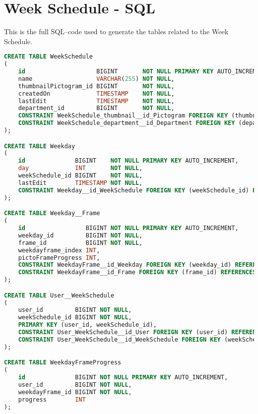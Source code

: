 \chapter{Week Schedule - SQL}\label{app:weekschedulesql}
This is the full SQL--code used to generate the tables related to the Week Schedule. 
\begin{lstlisting}[language=sql]
CREATE TABLE WeekSchedule
(
    id                    BIGINT       NOT NULL PRIMARY KEY AUTO_INCREMENT,
    name                  VARCHAR(255) NOT NULL,
    thumbnailPictogram_id BIGINT       NOT NULL,
    createdOn             TIMESTAMP    NOT NULL,
    lastEdit              TIMESTAMP    NOT NULL,
    department_id         BIGINT       NOT NULL,
    CONSTRAINT WeekSchedule_thumbnail__id_Pictogram FOREIGN KEY (thumbnailPictogram_id) REFERENCES Pictogram (frame_id),
    CONSTRAINT WeekSchedule_department__id_Department FOREIGN KEY (department_id) REFERENCES Department (id)
);

CREATE TABLE Weekday
(
    id              BIGINT    NOT NULL PRIMARY KEY AUTO_INCREMENT,
    day             INT       NOT NULL,
    weekSchedule_id BIGINT    NOT NULL,
    lastEdit        TIMESTAMP NOT NULL,
    CONSTRAINT Weekday__id_WeekSchedule FOREIGN KEY (weekSchedule_id) REFERENCES WeekSchedule (id)
);

CREATE TABLE Weekday__Frame
(
    id                 BIGINT NOT NULL PRIMARY KEY AUTO_INCREMENT,
    weekday_id         BIGINT NOT NULL,
    frame_id           BIGINT NOT NULL,
    weekdayframe_index INT,
    pictoFrameProgress INT,
    CONSTRAINT WeekdayFrame__id_Weekday FOREIGN KEY (weekday_id) REFERENCES Weekday (id),
    CONSTRAINT WeekdayFrame__id_Frame FOREIGN KEY (frame_id) REFERENCES Frame (id)
);

CREATE TABLE User__WeekSchedule
(
    user_id         BIGINT NOT NULL,
    weekSchedule_id BIGINT NOT NULL,
    PRIMARY KEY (user_id, weekSchedule_id),
    CONSTRAINT User_WeekSchedule__id_User FOREIGN KEY (user_id) REFERENCES User (id),
    CONSTRAINT User_WeekSchedule__id_WeekSchedule FOREIGN KEY (weekSchedule_id) REFERENCES WeekSchedule (id)
);

CREATE TABLE WeekdayFrameProgress
(
    id              BIGINT NOT NULL PRIMARY KEY AUTO_INCREMENT,
    user_id         BIGINT NOT NULL,
    weekdayFrame_id BIGINT NOT NULL,
    progress        INT
);

\end{lstlisting}